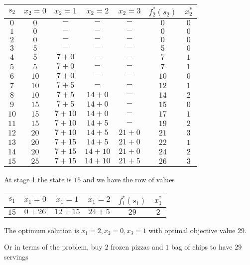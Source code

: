 \documentclass{article}[12pt,a4paper]
\begin{document}
\begin{enumerate}
\begin{multicols}{2}
  \columnbreak
  
  \begin{tabular}{c | c c c c | c | c}
  $s_2$ & $x_2 = 0$ & $x_2 = 1$ & $x_2 = 2$ & $x_2 = 3$ & $f_2^*(s_2)$ & $x_2^*$ \\
  \hline
  $0$ & $0$ & $-$ & $-$ & $-$ & $0$ & $0$ \\
  $1$ & $0$ &$-$ & $-$ & $-$ & $0$ & $0$ \\
  $2$ & $0$ & $-$ & $-$ & $-$ & $0$ & $0$ \\
  $3$ & $5$ & $-$ & $-$ & $-$ & $5$ & $0$ \\
  $4$ & $5$ & $7 + 0$ & $-$ & $-$ & $7$ & $1$ \\
  $5$ & $5$ & $7 + 0$ & $-$ & $-$ & $7$ & $1$ \\
  $6$ & $10$ & $7 + 0$ & $-$ & $-$ & $10$ & $0$ \\
  $7$ & $10$ & $7 + 5$ & $-$ & $-$ & $12$ & $1$ \\
  $8$ & $10$ & $7 + 5$ & $14 + 0$ & $-$ & $14$ & $2$ \\
  $9$ & $15$& $7 + 5$ & $14 + 0$ & $-$ & $15$ & $0$ \\
  $10$ & $15$ & $7 + 10$ & $14 + 0$ & $-$ & $17$ & $1$ \\
  $11$ & $15$ & $7 + 10$ & $14 + 5$ & $-$ & $19$ & $2$ \\
  $12$ & $20$ & $7 + 10$ & $14 + 5$ & $21 + 0$ & $21$ & $3$ \\
  $13$ & $20$ & $7 + 15$ & $14 + 5$ & $21 + 0$ & $22$ & $1$ \\
  $14$ & $20$ & $7 + 15$ & $14 + 10$ & $21 + 0$ & $24$ & $2$ \\
  $15$ & $25$ & $7 + 15$ & $14 + 10$ & $21 + 5$ & $26$ & $3$ \\
  \end{tabular}
  \end{multicols}
  
  At stage 1 the state is $15$ and we have the row of values
  \begin{center}
  \begin{tabular}{c | c c c | c | c}
  $s_1$ & $x_1 = 0$ & $x_1 = 1$ & $x_1 = 2$ & $f_1^*(s_1)$ & $x_1^*$ \\
  \hline
  $15$ & $0 + 26$ & $12 + 15$ & $24 + 5$ & $29$ & $2$
  \end{tabular}
  \end{center}
  The optimum solution is $x_1 = 2, x_2 = 0, x_3 = 1$ with optimal objective value $29$.
  
  Or in terms of the problem, buy $2$ frozen pizzas and $1$ bag of chips to have $29$ servings \newline
  

\end{enumerate}
\end{document}
